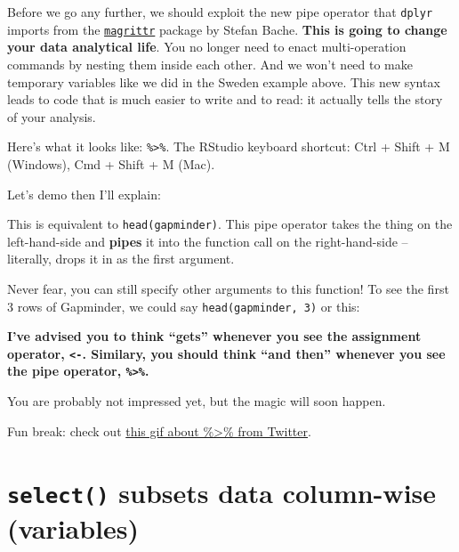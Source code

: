 \documentclass[]{book}
\newenvironment{Shaded}{\begin{snugshade}}{\end{snugshade}}
\newcommand{\KeywordTok}[1]{\textcolor[rgb]{0.13,0.29,0.53}{\textbf{#1}}}
\newcommand{\DecValTok}[1]{\textcolor[rgb]{0.00,0.00,0.81}{#1}}
\newcommand{\StringTok}[1]{\textcolor[rgb]{0.31,0.60,0.02}{#1}}
\newcommand{\OperatorTok}[1]{\textcolor[rgb]{0.81,0.36,0.00}{\textbf{#1}}}
\newcommand{\NormalTok}[1]{#1}
\theoremstyle{definition}
\theoremstyle{definition}
\theoremstyle{definition}
\theoremstyle{remark}
\begin{document}
Before we go any further, we should exploit the new pipe operator that
\texttt{dplyr} imports from the
\href{https://github.com/smbache/magrittr}{\texttt{magrittr}} package by
Stefan Bache. \textbf{This is going to change your data analytical
life}. You no longer need to enact multi-operation commands by nesting
them inside each other. And we won't need to make temporary variables
like we did in the Sweden example above. This new syntax leads to code
that is much easier to write and to read: it actually tells the story of
your analysis.

Here's what it looks like: \texttt{\%\textgreater{}\%}. The RStudio
keyboard shortcut: Ctrl + Shift + M (Windows), Cmd + Shift + M (Mac).

Let's demo then I'll explain:

\begin{Shaded}
\end{Shaded}

This is equivalent to \texttt{head(gapminder)}. This pipe operator takes
the thing on the left-hand-side and \textbf{pipes} it into the function
call on the right-hand-side -- literally, drops it in as the first
argument.

Never fear, you can still specify other arguments to this function! To
see the first 3 rows of Gapminder, we could say
\texttt{head(gapminder,\ 3)} or this:

\begin{Shaded}
\end{Shaded}

\textbf{I've advised you to think ``gets'' whenever you see the
assignment operator, \texttt{\textless{}-}. Similary, you should think
``and then'' whenever you see the pipe operator,
\texttt{\%\textgreater{}\%}.}

You are probably not impressed yet, but the magic will soon happen.

Fun break: check out
\href{https://twitter.com/backerman150/status/926479565869993984}{this
gif about \%\textgreater{}\% from Twitter}.

\section{\texorpdfstring{\texttt{select()} subsets data column-wise
(variables)}{select() subsets data column-wise (variables)}}\label{select-subsets-data-column-wise-variables}
\end{document}
